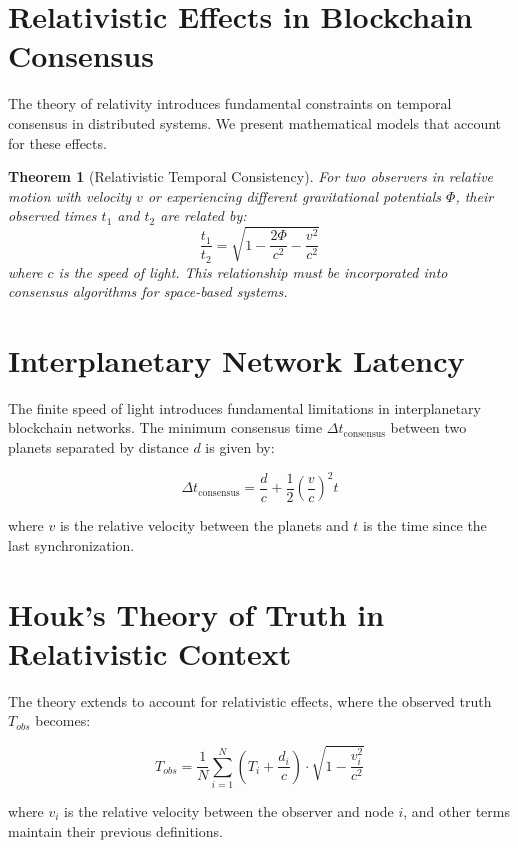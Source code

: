 \documentclass[12pt]{report}
\newtheorem{theorem}{Theorem}
\begin{document}
\section{Relativistic Effects in Blockchain Consensus}
The theory of relativity introduces fundamental constraints on temporal consensus in distributed systems. We present mathematical models that account for these effects.

\begin{theorem}[Relativistic Temporal Consistency]
For two observers in relative motion with velocity \( v \) or experiencing different gravitational potentials \( \Phi \), their observed times \( t_1 \) and \( t_2 \) are related by:
\begin{equation}
\frac{t_1}{t_2} = \sqrt{1 - \frac{2\Phi}{c^2} - \frac{v^2}{c^2}}
\end{equation}
where \( c \) is the speed of light. This relationship must be incorporated into consensus algorithms for space-based systems.
\end{theorem}

\section{Interplanetary Network Latency}
The finite speed of light introduces fundamental limitations in interplanetary blockchain networks. The minimum consensus time \( \Delta t_{\text{consensus}} \) between two planets separated by distance \( d \) is given by:

\begin{equation}
\Delta t_{\text{consensus}} = \frac{d}{c} + \frac{1}{2} \left(\frac{v}{c}\right)^2 t
\end{equation}

where \( v \) is the relative velocity between the planets and \( t \) is the time since the last synchronization.

\section{Houk's Theory of Truth in Relativistic Context}
The theory extends to account for relativistic effects, where the observed truth \( T_{obs} \) becomes:

\begin{equation}
T_{obs} = \frac{1}{N} \sum_{i=1}^{N} \left( T_i + \frac{d_i}{c} \right) \cdot \sqrt{1 - \frac{v_i^2}{c^2}}
\end{equation}

where \( v_i \) is the relative velocity between the observer and node \( i \), and other terms maintain their previous definitions.
\end{document}
